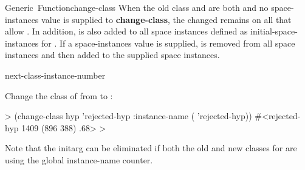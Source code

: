 \documentclass[10pt,twoside,english,pdftex]{article}
\begin{document}
\begin{functiondoc}{Generic~Function}{change-class}
When the old class and  are both  and no
space-instances value is supplied to \textbf{change-class}, the changed
 remains on all  that allow
 .  In addition,  is
also added to all space instances defined as initial-space-instances for
.  If a space-instances value is supplied,  is
removed from all space instances and then added to the supplied space
instances.

\begin{alsos}{next-class-instance-number}
\end{alsos}

\fnexample
{}%
%
Change the class of   from 
to :
%
\W\supp
\begin{example}
  > (change-class hyp 'rejected-hyp 
      :instance-name ( 'rejected-hyp))
  #<rejected-hyp 1409 (896 388) .68>
  >
\end{example} 
%
Note that the  initarg can be eliminated if both the old
and new classes for  are using the global instance-name counter.

\end{functiondoc}

\end{document}
